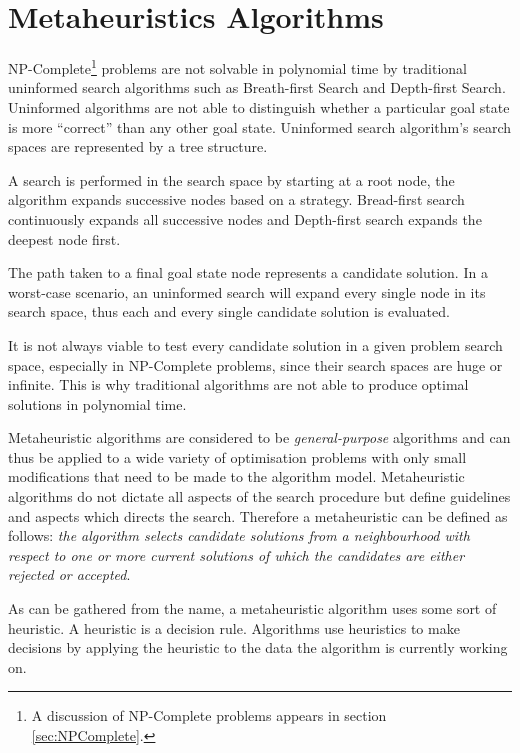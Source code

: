 \section{Metaheuristics Algorithms}
NP-Complete\footnote{A discussion of NP-Complete problems appears in section \ref{sec:NPComplete}.} problems are not solvable in polynomial time by traditional uninformed search algorithms such as Breath-first Search and Depth-first Search\cite{AIModernApproach}. 
Uninformed algorithms are not able to distinguish whether a particular goal state is more ``correct'' than any other goal state\cite{AIModernApproach}. Uninformed search algorithm's search spaces are represented by a tree structure\cite{AIModernApproach}. 

A search is performed in the search space by starting at a root node, the algorithm expands successive nodes based on a strategy\cite{AIModernApproach}. Bread-first search continuously expands all successive nodes and Depth-first search expands the deepest node first\cite{AIModernApproach}.

The path taken to a final  goal state node represents a candidate solution\cite{AIModernApproach}. In a worst-case scenario, an uninformed search will expand every single node in its search space, thus each and every single candidate solution is evaluated\cite{AIModernApproach}.

It is not always viable to test every candidate solution in a given problem search space, especially in NP-Complete problems, since their search spaces are huge or infinite. This is why traditional algorithms are not able to produce optimal solutions in polynomial time\cite{AIModernApproach}.

Metaheuristic algorithms are considered to be \emph{general-purpose} algorithms and can thus be applied to a wide variety of optimisation problems with only small modifications that need to be made to the algorithm model\cite{MetaGraph}.
Metaheuristic algorithms do not dictate all aspects of the search procedure but define guidelines and aspects which directs the search\cite{HandbookofMH}. Therefore a metaheuristic can be defined as follows: \emph{the algorithm selects candidate solutions from a neighbourhood with respect to one or more current solutions of which the candidates are either rejected or accepted}\cite{HandbookofMH}.

As can be gathered from the name, a metaheuristic algorithm uses some sort of heuristic. A heuristic is a decision rule. Algorithms use heuristics to make decisions by applying the heuristic to the data the algorithm is currently working on\cite{AIModernApproach,NatureInspiredMetaHeuristic}.

